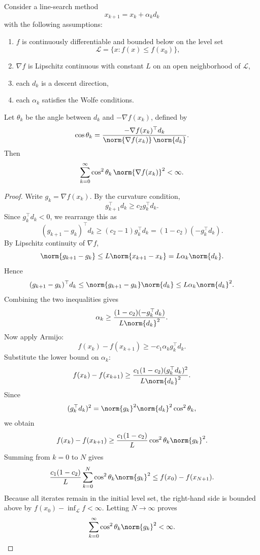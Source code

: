 \begin{theorem}\label{thm:l2-zoutendijk-condition}
	Consider a line-search method
	\[
		x_{k+1}=x_k+\alpha_k d_k
	\]
	with the following assumptions:
	\begin{enumerate}[label=(\roman*)]
		\item $f$ is continuously differentiable and bounded below on the level set
		      \[
			      \mathcal{L}=\{x : f(x)\le f(x_0)\},
		      \]
		\item $\nabla f$ is Lipschitz continuous with constant $L$ on an open neighborhood of $\mathcal{L}$,
		\item each $d_k$ is a descent direction,
		\item each $\alpha_k$ satisfies the Wolfe conditions.
	\end{enumerate}
	Let $\theta_k$ be the angle between $d_k$ and $-\nabla f(x_k)$, defined by
	\[
		\cos \theta_k
		=
		\frac{-\nabla f(x_k)^\top d_k}{\norm{\nabla f(x_k)}\,\norm{d_k}}.
	\]
	Then
	\[
		\sum_{k=0}^\infty \cos^2 \theta_k \, \norm{\nabla f(x_k)}^2 < \infty.
	\]
\end{theorem}
\begin{proof}
	Write $g_k=\nabla f(x_k)$. By the curvature condition,
	\[
		g_{k+1}^\top d_k \ge c_2 g_k^\top d_k.
	\]
	Since $g_k^\top d_k<0$, we rearrange this as
	\[
		(g_{k+1}-g_k)^\top d_k
		\ge
		(c_2-1)g_k^\top d_k
		=
		(1-c_2)(-g_k^\top d_k).
	\]
	By Lipschitz continuity of $\nabla f$,
	\[
		\norm{g_{k+1}-g_k}
		\le
		L \norm{x_{k+1}-x_k}
		=
		L\alpha_k \norm{d_k}.
	\]
	Hence
	\[
		(g_{k+1}-g_k)^\top d_k
		\le
		\norm{g_{k+1}-g_k}\norm{d_k}
		\le
		L\alpha_k \norm{d_k}^2.
	\]
	Combining the two inequalities gives
	\[
		\alpha_k
		\ge
		\frac{(1-c_2)(-g_k^\top d_k)}{L\norm{d_k}^2}.
	\]
	Now apply Armijo:
	\[
		f(x_k)-f(x_{k+1})
		\ge
		-c_1 \alpha_k g_k^\top d_k.
	\]
	Substitute the lower bound on $\alpha_k$:
	\[
		f(x_k)-f(x_{k+1})
		\ge
		\frac{c_1(1-c_2)(g_k^\top d_k)^2}{L\norm{d_k}^2}.
	\]
	Since
	\[
		(g_k^\top d_k)^2
		=
		\norm{g_k}^2 \norm{d_k}^2 \cos^2 \theta_k,
	\]
	we obtain
	\[
		f(x_k)-f(x_{k+1})
		\ge
		\frac{c_1(1-c_2)}{L}
		\cos^2 \theta_k \norm{g_k}^2.
	\]
	Summing from $k=0$ to $N$ gives
	\[
		\frac{c_1(1-c_2)}{L}
		\sum_{k=0}^N \cos^2 \theta_k \norm{g_k}^2
		\le
		f(x_0)-f(x_{N+1}).
	\]
	Because all iterates remain in the initial level set, the right-hand side is bounded above by $f(x_0)-\inf_{\mathcal{L}} f < \infty$. Letting $N \to \infty$ proves
	\[
		\sum_{k=0}^\infty \cos^2 \theta_k \norm{g_k}^2 < \infty.
	\]
\end{proof}

